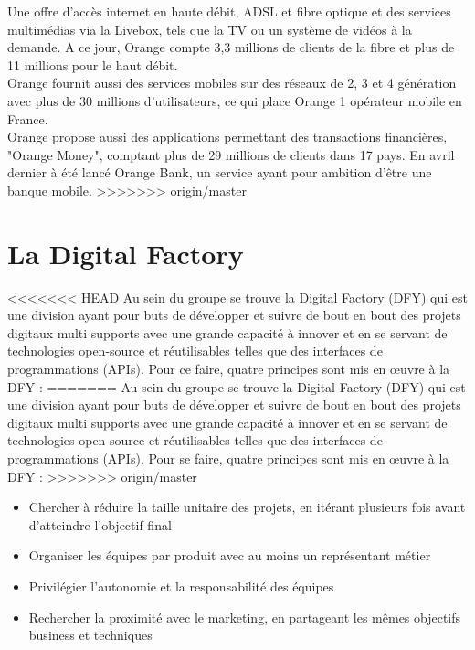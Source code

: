 Une offre d'accès internet en haute débit, ADSL et fibre optique et des services multimédias via la Livebox, tels que la TV ou un système de vidéos à la demande. A ce jour, Orange compte 3,3 millions de clients de la fibre et plus de 11 millions pour le haut débit.\\
Orange fournit aussi des services mobiles sur des réseaux de 2, 3 et 4 génération avec plus de 30 millions d'utilisateurs, ce qui place Orange 1 opérateur mobile en France.\\
Orange propose aussi des applications permettant des transactions financières, "Orange Money", comptant plus de 29 millions de clients dans 17 pays. En avril dernier à été lancé Orange Bank, un service ayant pour ambition d'être une banque mobile.
>>>>>>> origin/master


\section{La Digital Factory}

<<<<<<< HEAD
Au sein du groupe se trouve la Digital Factory (DFY) qui est une division ayant pour buts de développer et suivre de bout en bout des projets digitaux multi supports avec une grande capacité à innover et en se servant de technologies open-source et réutilisables telles que des interfaces de programmations (APIs). Pour ce faire, quatre principes sont mis en \oe{}uvre à la DFY :
=======
Au sein du groupe se trouve la Digital Factory (DFY) qui est une division ayant pour buts de développer et suivre de bout en bout des projets digitaux multi supports avec une grande capacité à innover et en se servant de technologies open-source et réutilisables telles que des interfaces de programmations (APIs). Pour se faire, quatre principes sont mis en \oe{}uvre à la DFY :
>>>>>>> origin/master

\begin{itemize}
    \item Chercher à réduire la taille unitaire des projets, en itérant plusieurs fois avant 	d’atteindre l’objectif final
    \item Organiser les équipes par produit avec au moins un représentant métier
    \item Privilégier l’autonomie et la responsabilité des équipes
    \item Rechercher la proximité avec le marketing, en partageant les mêmes objectifs business et techniques
\end{itemize}

